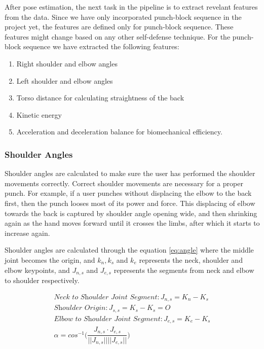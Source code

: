 After pose estimation, the next task in the pipeline is to extract revelant features from  the data. Since we have only incorporated punch-block sequence in the project yet, the features are defined only for punch-block sequence. These features might change based on any other self-defense technique. For the punch-block sequence \cite{karatePunch} we have extracted the following features:

\begin{enumerate}
  \item Right shoulder and elbow angles 
  \item Left shoulder and elbow angles 
  \item Torso distance for calculating straightness of the back
  \item Kinetic energy 
  \item Acceleration and deceleration balance for biomechanical efficiency. 
\end{enumerate}

\subsubsection{Shoulder Angles}
Shoulder angles are calculated to make sure the user has performed the shoulder movements correctly. Correct shoulder movements are necessary for a proper punch. For example, if a user punches without displacing the elbow to the back first, then the punch looses most of its power and force. This displacing of elbow towards the back is captured by shoulder angle opening wide, and then shrinking again as the hand moves forward until it crosses the limbs, after which it starts to increase again. 

Shoulder angles are calculated through the equation \ref{eq:angle} where the middle joint becomes the origin, and $k_n, k_s$ and $k_e$ represents the neck, shoulder and elbow keypoints, and $J_{n,s}$ and $J_{e,s}$ represents the segments from neck  and elbow to shoulder respectively. 

\begin{gather}
  \textit{Neck to Shoulder Joint Segment}: J_{n,s} = K_n - K_s \\
  \textit{Shoulder Origin}: J_{s,s} = K_s - K_s = O \\
  \textit{Elbow to Shoulder Joint Segment}: J_{e,s} = K_e - K_s \\
  \alpha = cos^{-1} \big (\dfrac{J_{n,s} \cdot J_{e,s}}{||J_{n,s}|| ||J_{e,s}||})
  \label{eq:angle}
\end{gather}

